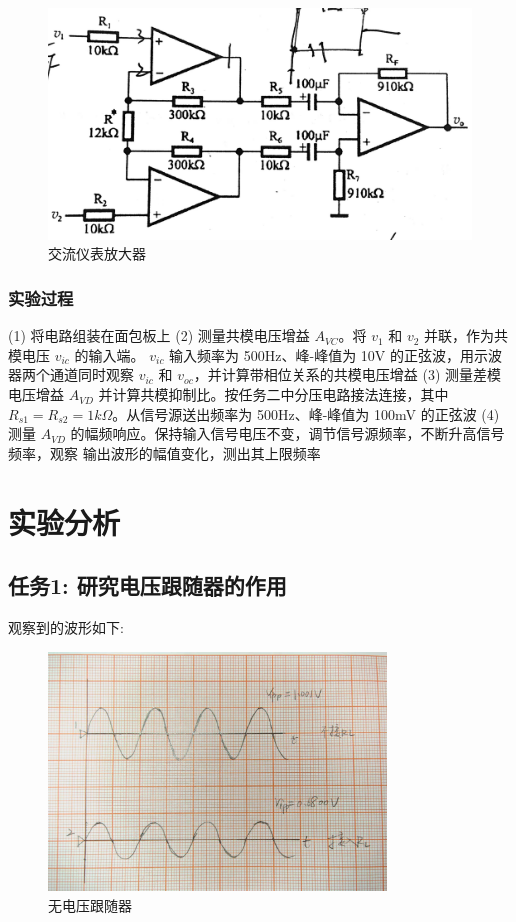 \documentclass[a4paper,11pt,UTF8]{article}
\begin{document}
\begin{figure}[H]
	\centering
	\includegraphics[scale=0.18]{1.11.jpg}
	\caption{交流仪表放大器}
\end{figure}

\subsubsection{实验过程}

(1) 将电路组装在面包板上
(2) 测量共模电压增益 $A_{VC}$。将 $v_1$ 和 $v_2$ 并联，作为共模电压 $v_{ic}$ 的输入端。
$v_{ic}$ 输入频率为 500Hz、峰-峰值为 10V 的正弦波，用示波器两个通道同时观察 $v_{ic}$ 和
$v_{oc}$，并计算带相位关系的共模电压增益
(3) 测量差模电压增益 $A_{VD}$ 并计算共模抑制比。按任务二中分压电路接法连接，其中 
$R_{s1} = R_{s2} = 1k\Omega$。从信号源送出频率为 500Hz、峰-峰值为 100mV 的正弦波
(4) 测量 $A_{VD}$ 的幅频响应。保持输入信号电压不变，调节信号源频率，不断升高信号频率，观察
输出波形的幅值变化，测出其上限频率

\section{实验分析}

\subsection{任务1: 研究电压跟随器的作用}
观察到的波形如下:

\begin{figure}[H]
	\centering
	\includegraphics[width = 0.8\textwidth]{1.5.jpg}
	\caption{无电压跟随器}
\end{figure}
\end{document}
